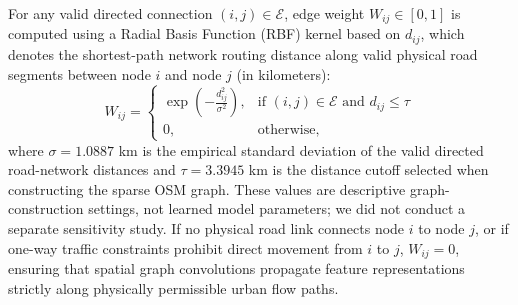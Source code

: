 \documentclass[journal,twocolumn]{IEEEtran}
\begin{document}
For any valid directed connection $(i,j) \in \mathcal{E}$, edge weight $W_{ij} \in [0, 1]$ is computed using a Radial Basis Function (RBF) kernel based on $d_{ij}$, which denotes the shortest-path network routing distance along valid physical road segments between node $i$ and node $j$ (in kilometers):
\begin{equation}
W_{ij} = \begin{cases} \exp\left(-\frac{d_{ij}^2}{\sigma^2}\right), & \text{if } (i,j) \in \mathcal{E} \text{ and } d_{ij} \le \tau \\ 0, & \text{otherwise,} \end{cases}
\end{equation}
where $\sigma = 1.0887$ km is the empirical standard deviation of the valid directed road-network distances and $\tau = 3.3945$ km is the distance cutoff selected when constructing the sparse OSM graph. These values are descriptive graph-construction settings, not learned model parameters; we did not conduct a separate sensitivity study. If no physical road link connects node $i$ to node $j$, or if one-way traffic constraints prohibit direct movement from $i$ to $j$, $W_{ij} = 0$, ensuring that spatial graph convolutions propagate feature representations strictly along physically permissible urban flow paths.
\end{document}
